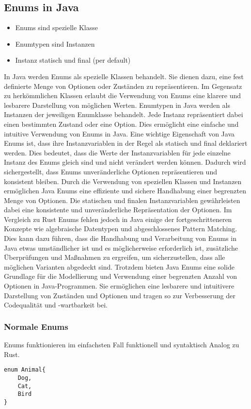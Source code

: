 \documentclass[a4paper, 1ppt]{article}
\begin{document}
\subsection{Enums in Java}
\begin{itemize}
	\item Enums sind spezielle Klasse
	\item Enumtypen sind Instanzen
	\item Instanz statisch und final (per default)
\end{itemize}
In Java werden Enums als spezielle Klassen behandelt. Sie dienen dazu, eine fest definierte Menge von Optionen oder Zuständen zu repräsentieren. Im Gegensatz zu herkömmlichen Klassen erlaubt die Verwendung von Enums eine klarere und lesbarere Darstellung von möglichen Werten.
Enumtypen in Java werden als Instanzen der jeweiligen Enumklasse behandelt. Jede Instanz repräsentiert dabei einen bestimmten Zustand oder eine Option. Dies ermöglicht eine einfache und intuitive Verwendung von Enums in Java.
Eine wichtige Eigenschaft von Java Enums ist, dass ihre Instanzvariablen in der Regel als statisch und final deklariert werden. Dies bedeutet, dass die Werte der Instanzvariablen für jede einzelne Instanz des Enums gleich sind und nicht verändert werden können. Dadurch wird sichergestellt, dass Enums unveränderliche Optionen repräsentieren und konsistent bleiben.
Durch die Verwendung von speziellen Klassen und Instanzen ermöglichen Java Enums eine effiziente und sichere Handhabung einer begrenzten Menge von Optionen. Die statischen und finalen Instanzvariablen gewährleisten dabei eine konsistente und unveränderliche Repräsentation der Optionen.
Im Vergleich zu Rust Enums fehlen jedoch in Java einige der fortgeschritteneren Konzepte wie algebraische Datentypen und abgeschlossenes Pattern Matching. Dies kann dazu führen, dass die Handhabung und Verarbeitung von Enums in Java etwas umständlicher ist und es möglicherweise erforderlich ist, zusätzliche Überprüfungen und Maßnahmen zu ergreifen, um sicherzustellen, dass alle möglichen Varianten abgedeckt sind.
Trotzdem bieten Java Enums eine solide Grundlage für die Modellierung und Verwendung einer begrenzten Anzahl von Optionen in Java-Programmen. Sie ermöglichen eine lesbarere und intuitivere Darstellung von Zuständen und Optionen und tragen so zur Verbesserung der Codequalität und -wartbarkeit bei.
\subsubsection{Normale Enums}
Enums funktionieren im einfachsten Fall funktionell und syntaktisch Analog zu Rust.
\begin{verbatim}
enum Animal{
    Dog,
    Cat,
    Bird
}
\end{verbatim}
\end{document}
